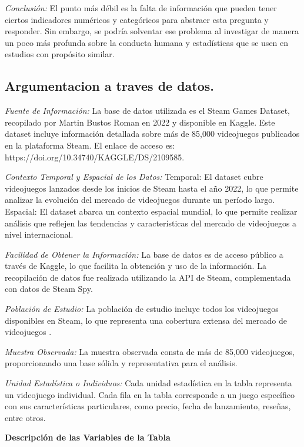 \documentclass[
  letterpaper,
  DIV=11,
  numbers=noendperiod]{scrreprt}
\begin{document}
\emph{Conclusión:} El punto más débil es la falta de información que
pueden tener ciertos indicadores numéricos y categóricos para abstraer
esta pregunta y responder. Sin embargo, se podría solventar ese problema
al investigar de manera un poco más profunda sobre la conducta humana y
estadísticas que se usen en estudios con propósito similar.

\subsection{Argumentacion a traves de
datos.}\label{argumentacion-a-traves-de-datos.}

\emph{Fuente de Información:} La base de datos utilizada es el Steam
Games Dataset, recopilado por Martin Bustos Roman en 2022 y disponible
en Kaggle. Este dataset incluye información detallada sobre más de
85,000 videojuegos publicados en la plataforma Steam. El enlace de
acceso es: https://doi.org/10.34740/KAGGLE/DS/2109585.

\emph{Contexto Temporal y Espacial de los Datos:} Temporal: El dataset
cubre videojuegos lanzados desde los inicios de Steam hasta el año 2022,
lo que permite analizar la evolución del mercado de videojuegos durante
un período largo. Espacial: El dataset abarca un contexto espacial
mundial, lo que permite realizar análisis que reflejen las tendencias y
características del mercado de videojuegos a nivel internacional.

\emph{Facilidad de Obtener la Información:} La base de datos es de
acceso público a través de Kaggle, lo que facilita la obtención y uso de
la información. La recopilación de datos fue realizada utilizando la API
de Steam, complementada con datos de Steam Spy.

\emph{Población de Estudio:} La población de estudio incluye todos los
videojuegos disponibles en Steam, lo que representa una cobertura
extensa del mercado de videojuegos .

\emph{Muestra Observada:} La muestra observada consta de más de 85,000
videojuegos, proporcionando una base sólida y representativa para el
análisis.

\emph{Unidad Estadística o Individuos:} Cada unidad estadística en la
tabla representa un videojuego individual. Cada fila en la tabla
corresponde a un juego específico con sus características particulares,
como precio, fecha de lanzamiento, reseñas, entre otros.

\textbf{Descripción de las Variables de la Tabla}
\end{document}
